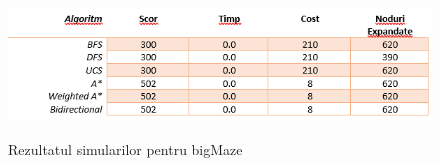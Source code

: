 \begin{figure}[h]
    \centering
    \includegraphics[width10cm]{text/images/pic4.png}\\
    \caption{Rezultatul simularilor pentru bigMaze}
\end{figure}






